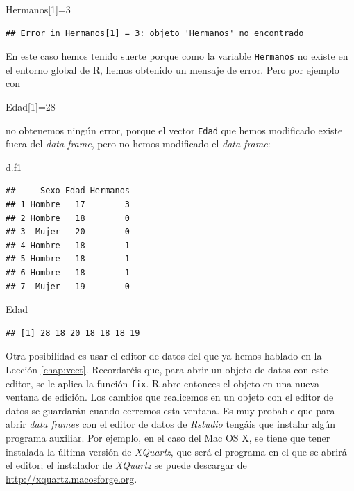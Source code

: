 \documentclass[]{book}
\newenvironment{Shaded}{\begin{snugshade}}{\end{snugshade}}
\newcommand{\DecValTok}[1]{\textcolor[rgb]{0.00,0.00,0.81}{#1}}
\newcommand{\NormalTok}[1]{#1}
\theoremstyle{definition}
\theoremstyle{definition}
\theoremstyle{definition}
\theoremstyle{remark}
\begin{document}
\begin{Shaded}
\begin{Highlighting}[]
\NormalTok{Hermanos[}\DecValTok{1}\NormalTok{]=}\DecValTok{3}
\end{Highlighting}
\end{Shaded}

\begin{verbatim}
## Error in Hermanos[1] = 3: objeto 'Hermanos' no encontrado
\end{verbatim}

En este caso hemos tenido suerte porque como la variable \texttt{Hermanos} no existe en el entorno global de R, hemos obtenido un mensaje de error. Pero por ejemplo con

\begin{Shaded}
\begin{Highlighting}[]
\NormalTok{Edad[}\DecValTok{1}\NormalTok{]=}\DecValTok{28}
\end{Highlighting}
\end{Shaded}

no obtenemos ningún error, porque el vector \texttt{Edad} que hemos modificado existe fuera del \emph{data frame}, pero no hemos modificado el \emph{data frame}:

\begin{Shaded}
\begin{Highlighting}[]
\NormalTok{d.f1}
\end{Highlighting}
\end{Shaded}

\begin{verbatim}
##     Sexo Edad Hermanos
## 1 Hombre   17        3
## 2 Hombre   18        0
## 3  Mujer   20        0
## 4 Hombre   18        1
## 5 Hombre   18        1
## 6 Hombre   18        1
## 7  Mujer   19        0
\end{verbatim}

\begin{Shaded}
\begin{Highlighting}[]
\NormalTok{Edad}
\end{Highlighting}
\end{Shaded}

\begin{verbatim}
## [1] 28 18 20 18 18 18 19
\end{verbatim}

Otra posibilidad es usar el editor de datos del que ya hemos hablado en la Lección \ref{chap:vect}. Recordaréis que, para abrir un objeto de datos con este editor, se le aplica la función \texttt{fix}. R abre entonces el objeto en una nueva ventana de edición. Los cambios que realicemos en un objeto con el editor de datos se guardarán cuando cerremos esta ventana. Es muy probable que para abrir \emph{data frames} con el editor de datos de \emph{Rstudio} tengáis que instalar algún programa auxiliar. Por ejemplo, en el caso del Mac OS X, se tiene que tener instalada la última versión de \emph{XQuartz}, que será el programa en el que se abrirá el editor; el instalador de \emph{XQuartz} se puede descargar de \url{http://xquartz.macosforge.org}.
\end{document}
